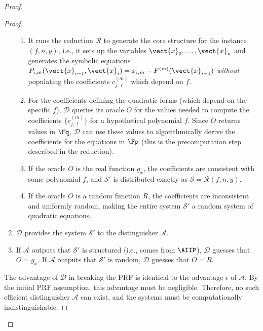\begin{proof}
\begin{proof}
\begin{enumerate}
                        \begin{enumerate}
                            \item It runs the reduction $\mathcal{R}$ to generate the core structure for the instance $(f, n, y)$, i.e., it sets up the variables $\vect{x}_0, \ldots, \vect{x}_n$ and generates the symbolic equations $P_{i,m}(\vect{x}_{i-1}, \vect{x}_i) = x_{i,m} - F^{(m)}(\vect{x}_{i-1})$ \textit{without} populating the coefficients $c_{j, \boldsymbol{\ell}}^{(m)}$ which depend on $f$.
                            \item For the coefficients defining the quadratic forms (which depend on the specific $f$), $\mathcal{D}$ queries its oracle $O$ for the values needed to compute the coefficients $\{c_{j, \boldsymbol{\ell}}^{(m)}\}$ for a hypothetical polynomial $f$. Since $O$ returns values in $\Fq$, $\mathcal{D}$ can use these values to algorithmically derive the coefficients for the equations in $\Fp$ (this is the precomputation step described in the reduction).
                            \item If the oracle $O$ is the real function $g_x$, the coefficients are consistent with some polynomial $f$, and $\mathcal{S}'$ is distributed exactly as $\mathcal{S} = \mathcal{R}(f, n, y)$.
                            \item If the oracle $O$ is a random function $R$, the coefficients are inconsistent and uniformly random, making the entire system $\mathcal{S}'$ a random system of quadratic equations.
                        \end{enumerate}
                        \item $\mathcal{D}$ provides the system $\mathcal{S}'$ to the distinguisher $\mathcal{A}$.
                        \item If $\mathcal{A}$ outputs that $\mathcal{S}'$ is structured (i.e., comes from $\AIIP$), $\mathcal{D}$ guesses that $O = g_x$. If $\mathcal{A}$ outputs that $\mathcal{S}'$ is random, $\mathcal{D}$ guesses that $O = R$.
                    \end{enumerate}
                    The advantage of $\mathcal{D}$ in breaking the PRF is identical to the advantage $\epsilon$ of $\mathcal{A}$. By the initial PRF assumption, this advantage must be negligible. Therefore, no such efficient distinguisher $\mathcal{A}$ can exist, and the systems must be computationally indistinguishable.
                \end{proof}
                \begin{remark}

\end{remark}
\end{proof}

